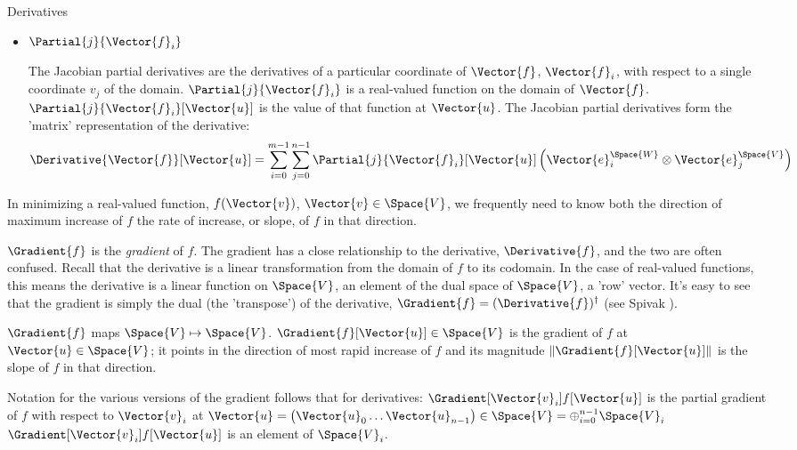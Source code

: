 \begin{plSection}{Derivatives}
\begin{itemize}
\item $\Partial{j}{\Vector{f}_i}$

The Jacobian partial derivatives are the derivatives of
a particular coordinate of $\Vector{f}$, $\Vector{f}_i$, 
with respect to
a single coordinate $v_j$ of the domain.
$\Partial{j}{\Vector{f}_i}$ is a real-valued function 
on the domain of $\Vector{f}$.
$\Partial{j}{\Vector{f}_i}[\Vector{u}]$ 
is the value of that function at $\Vector{u}$.
The Jacobian partial derivatives form 
the 'matrix' representation of the derivative:
\begin{equation}
\Derivative{\Vector{f}}[\Vector{u}] =
\sum_{i=0}^{m-1}
\sum_{j=0}^{n-1}
\Partial{j}{\Vector{f}_i}[\Vector{u}]
\left( 
\Vector{e}_i^{\Space{W}} \otimes \Vector{e}_j^{\Space{V}} 
\right)
\end{equation}

\end{itemize}

In minimizing a real-valued function, 
$f(\Vector{v})$, $\Vector{v} \in \Space{V}$,
we frequently need to know 
both the direction of maximum increase of $f$
the rate of increase, or slope, of $f$ in that direction.

$\Gradient{f}$ is the \textit{gradient} of $f$.
The gradient has a close relationship to the derivative, $\Derivative{f}$,
and the two are often confused.
Recall that the derivative is a linear transformation
from the domain of $f$ to its codomain.
In the case of real-valued functions,
this means the derivative is a linear function on $\Space{V}$,
an element of the dual space of $\Space{V}$, a 'row' vector.
It's easy to see that the gradient is simply the dual (the 'transpose')
of the derivative, $\Gradient{f} = (\Derivative{f})^{\dagger}$
(see Spivak \cite[p.~96, ex.~4-18]{Spivak:1965:CalculusOnManifolds}).

$\Gradient{f}$ maps $\Space{V} \mapsto \Space{V}$.
$\Gradient{f}[\Vector{u}] \in \Space{V}$ 
is the gradient of $f$ at $\Vector{u} \in \Space{V}$;
it points in the direction of most rapid increase of
$f$ and its magnitude $\| \Gradient{f}[\Vector{u}] \|$ is the
slope of $f$ in that direction.

Notation for the various versions of the gradient
follows that for derivatives:
$\Gradient[\Vector{v}_i]{f}[\Vector{u}]$ 
is the partial gradient of $f$ with respect to $\Vector{v}_i$ at
$\Vector{u} = \left( \Vector{u}_0 \ldots \Vector{u}_{n-1} \right) 
\in \Space{V} = \oplus_{i=0}^{n-1} \Space{V}_i$
$\Gradient[\Vector{v}_i]{f}[\Vector{u}]$ 
is an element of $\Space{V}_i$.


\end{plSection}

